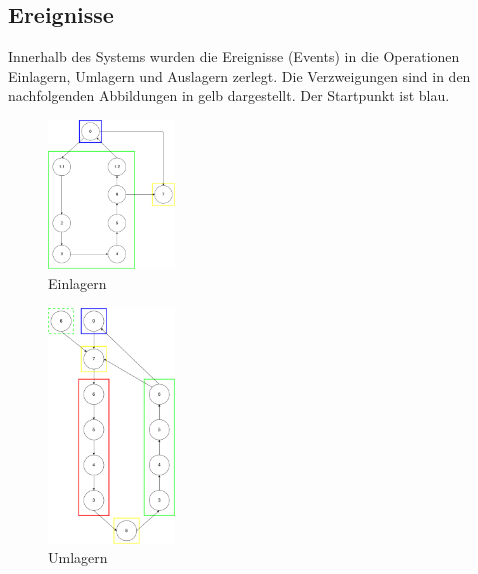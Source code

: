 \subsection{Ereignisse}
Innerhalb des Systems wurden die Ereignisse (Events) in die Operationen Einlagern, Umlagern und Auslagern zerlegt. Die Verzweigungen sind in den nachfolgenden Abbildungen in gelb dargestellt. Der Startpunkt ist blau. 
%
% 
% 
% 
% 
% 
% 
% 
% 
%
\begin{figure}[H]
  \begin{center}
    \includegraphics[width=0.3\textwidth]{images/einlagern.png}
    \caption{Einlagern}
    \label{fig:in}
  \end{center}
\end{figure}
%
\begin{figure}[H]
  \begin{center}
    \includegraphics[width=0.3\textwidth]{images/umlagern.png}
    \caption{Umlagern}
    \label{fig:move}
  \end{center}
\end{figure}
